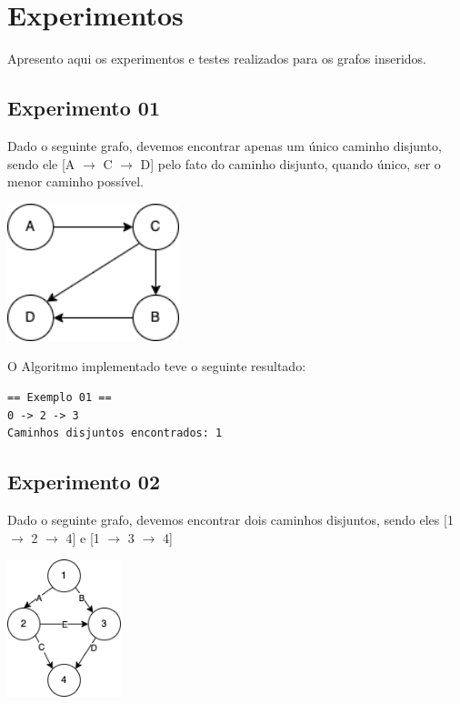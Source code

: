 \section{Experimentos}
Apresento aqui os experimentos e testes realizados para os grafos inseridos.
\subsection{Experimento 01}

Dado o seguinte grafo, devemos encontrar apenas um único caminho disjunto, sendo ele [A $\rightarrow$ C $\rightarrow$ D] pelo fato do caminho disjunto, quando único, ser o menor caminho possível.

\begin{center}
\includegraphics[width=5cm, height=4cm]{figuras/01.png}
\end{center}

O Algoritmo implementado teve o seguinte resultado:

\begin{scriptsize}
\estiloR
\begin{lstlisting}[title={Exemplo 01}, label=lst:javacode]
 == Exemplo 01 == 
0 -> 2 -> 3
Caminhos disjuntos encontrados: 1 
\end{lstlisting}
\end{scriptsize}

\subsection{Experimento 02}

Dado o seguinte grafo, devemos encontrar dois caminhos disjuntos, sendo eles [1 $\rightarrow$ 2 $\rightarrow$ 4] e [1 $\rightarrow$ 3 $\rightarrow$ 4]

\begin{center}
\includegraphics[height=4cm]{figuras/02.png}
\end{center}

